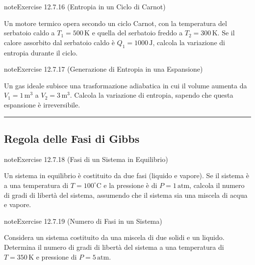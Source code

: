 \documentclass[letterpaper,10pt,italian]{jupyterBook}
\begin{document}
\begin{sphinxadmonition}{note}{Exercise 12.7.16 (Entropia in un Ciclo di Carnot)}



\sphinxAtStartPar
Un motore termico opera secondo un ciclo Carnot, con la temperatura del serbatoio caldo a \(T_1 = 500 \, \text{K}\) e quella del serbatoio freddo a \(T_2 = 300 \, \text{K}\). Se il calore assorbito dal serbatoio caldo è \(Q_1 = 1000 \, \text{J}\), calcola la variazione di entropia durante il ciclo.
\end{sphinxadmonition}
 \label{exercise:ch/thermodynamics/principles-problems-exercise-16}

\begin{sphinxadmonition}{note}{Exercise 12.7.17 (Generazione di Entropia in una Espansione)}



\sphinxAtStartPar
Un gas ideale subisce una trasformazione adiabatica in cui il volume aumenta da \(V_1 = 1 \, \text{m}^3\) a \(V_2 = 3 \, \text{m}^3\). Calcola la variazione di entropia, sapendo che questa espansione è irreversibile.
\end{sphinxadmonition}


\bigskip\hrule\bigskip



\subsection{Regola delle Fasi di Gibbs}
\label{\detokenize{ch/thermodynamics/principles-problems:regola-delle-fasi-di-gibbs}} \label{exercise:ch/thermodynamics/principles-problems-exercise-17}

\begin{sphinxadmonition}{note}{Exercise 12.7.18 (Fasi di un Sistema in Equilibrio)}



\sphinxAtStartPar
Un sistema in equilibrio è costituito da due fasi (liquido e vapore). Se il sistema è a una temperatura di \(T = 100^\circ \text{C}\) e la pressione è di \(P = 1 \, \text{atm}\), calcola il numero di gradi di libertà del sistema, assumendo che il sistema sia una miscela di acqua e vapore.
\end{sphinxadmonition}
 \label{exercise:ch/thermodynamics/principles-problems-exercise-18}

\begin{sphinxadmonition}{note}{Exercise 12.7.19 (Numero di Fasi in un Sistema)}



\sphinxAtStartPar
Considera un sistema costituito da una miscela di due solidi e un liquido. Determina il numero di gradi di libertà del sistema a una temperatura di \(T = 350 \, \text{K}\) e pressione di \(P = 5 \, \text{atm}\).
\end{sphinxadmonition}
 \label{exercise:ch/thermodynamics/principles-problems-exercise-19}
\end{document}
